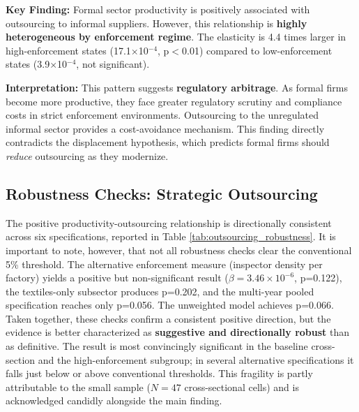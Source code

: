 \noindent \textbf{Key Finding:} Formal sector productivity is positively associated with outsourcing to informal suppliers. However, this relationship is \textbf{highly heterogeneous by enforcement regime}. The elasticity is 4.4 times larger in high-enforcement states (17.1$\times$10$^{-4}$, p$<$0.01) compared to low-enforcement states (3.9$\times$10$^{-4}$, not significant).

\noindent \textbf{Interpretation:} This pattern suggests \textbf{regulatory arbitrage}. As formal firms become more productive, they face greater regulatory scrutiny and compliance costs in strict enforcement environments. Outsourcing to the unregulated informal sector provides a cost-avoidance mechanism. This finding directly contradicts the displacement hypothesis, which predicts formal firms should \textit{reduce} outsourcing as they modernize.

\subsection{Robustness Checks: Strategic Outsourcing}
\label{sec:outsourcing_robustness}

The positive productivity-outsourcing relationship is directionally consistent across six specifications, reported in Table \ref{tab:outsourcing_robustness}. It is important to note, however, that not all robustness checks clear the conventional 5\% threshold. The alternative enforcement measure (inspector density per factory) yields a positive but non-significant result ($\beta = 3.46 \times 10^{-6}$, p=0.122), the textiles-only subsector produces p=0.202, and the multi-year pooled specification reaches only p=0.056. The unweighted model achieves p=0.066. Taken together, these checks confirm a consistent positive direction, but the evidence is better characterized as \textbf{suggestive and directionally robust} than as definitive. The result is most convincingly significant in the baseline cross-section and the high-enforcement subgroup; in several alternative specifications it falls just below or above conventional thresholds. This fragility is partly attributable to the small sample ($N=47$ cross-sectional cells) and is acknowledged candidly alongside the main finding.

